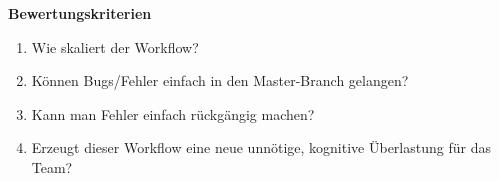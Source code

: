 \begin{frame}[c]
    \slidehead
    \large
    \textbf{Bewertungskriterien}
    \normalsize
    \begin{enumerate}
        \item<2-> Wie skaliert der Workflow? 
        \item<4-> Können Bugs/Fehler einfach in den Master-Branch gelangen? 
        \item<6-> Kann man Fehler einfach rückgängig machen? 
        \item<8-> Erzeugt dieser Workflow eine neue unnötige, kognitive Überlastung für das Team? 
    \end{enumerate}
\end{frame}
